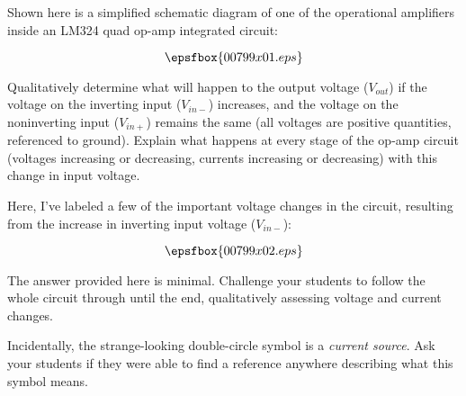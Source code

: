 

Shown here is a simplified schematic diagram of one of the operational amplifiers inside an LM324 quad op-amp integrated circuit:

$$\epsfbox{00799x01.eps}$$

Qualitatively determine what will happen to the output voltage ($V_{out}$) if the voltage on the inverting input ($V_{in-}$) increases, and the voltage on the noninverting input ($V_{in+}$) remains the same (all voltages are positive quantities, referenced to ground).  Explain what happens at every stage of the op-amp circuit (voltages increasing or decreasing, currents increasing or decreasing) with this change in input voltage.







Here, I've labeled a few of the important voltage changes in the circuit, resulting from the increase in inverting input voltage ($V_{in-}$):

$$\epsfbox{00799x02.eps}$$







The answer provided here is minimal.  Challenge your students to follow the whole circuit through until the end, qualitatively assessing voltage and current changes.

Incidentally, the strange-looking double-circle symbol is a {\it current source}.  Ask your students if they were able to find a reference anywhere describing what this symbol means.




